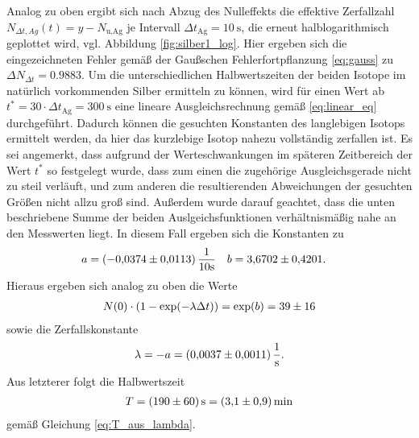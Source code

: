 \noindent
Analog zu oben ergibt sich nach Abzug des Nulleffekts die effektive Zerfallzahl 
$N_{\Delta t,Ag}(t) = y- N_\text{u,Ag}$ je Intervall $\Delta t_\text{Ag} = \qty[]{10}{\second}$,
die erneut halblogarithmisch geplottet wird, vgl. Abbildung \ref{fig:silber1_log}.
Hier ergeben sich die eingezeichneten Fehler gemäß der Gaußschen Fehlerfortpflanzung \eqref{eq:gauss} zu $\Delta N_{\Delta t} = \num{0.9883}$.
Um die unterschiedlichen Halbwertszeiten der beiden Isotope im natürlich vorkommenden Silber ermitteln zu können, wird für einen Wert ab 
$t^* = 30 \cdot \Delta t_\text{Ag} = \qty[]{300}{\second}$ eine lineare Ausgleichsrechnung gemäß \eqref{eq:linear_eq} durchgeführt.
Dadurch können die gesuchten Konstanten des langlebigen Isotops ermittelt werden, da hier das kurzlebige Isotop nahezu vollständig zerfallen ist.
Es sei angemerkt, dass aufgrund der Werteschwankungen im späteren Zeitbereich der Wert $t^*$ so festgelegt wurde, 
dass zum einen die zugehörige Ausgleichsgerade nicht zu steil verläuft,
und zum anderen die resultierenden Abweichungen der gesuchten Größen nicht allzu groß sind.
Außerdem wurde darauf geachtet, dass die unten beschriebene Summe der beiden Auslgeichsfunktionen verhältnismäßig nahe an den Messwerten liegt.
In diesem Fall ergeben sich die Konstanten zu 
\begin{align}
    a &= (\num{-0.0374 +- 0.0113}) \, \frac{1}{10 \unit{\second}}  & b &= \num{3.6702 +- 0.4201}.
\end{align}
Hieraus ergeben sich analog zu oben die Werte 
\begin{align}
    N(0) \cdot \left(1- \exp(- \lambda \Delta t)\right) = \exp(b) = \num[]{39 +- 16}
\end{align}
sowie die Zerfallskonstante 
\begin{align}
    \lambda = - a = \qty[]{0.0037 +- 0.0011}{\per\second}.
\end{align}
Aus letzterer folgt die Halbwertszeit 
\begin{align}
    T = \qty[]{190 +- 60}{\second} = \qty[]{3.1 +- 0.9}{\minute}
\end{align}
gemäß Gleichung \eqref{eq:T_aus_lambda}.





